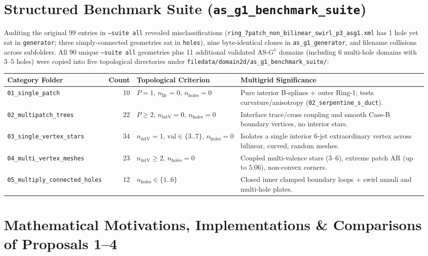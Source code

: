 \documentclass[10pt,a4paper]{article}
\begin{document}
\section{Structured Benchmark Suite (\texttt{as\_g1\_benchmark\_suite})}
Auditing the original 99 entries in \texttt{--suite all} revealed misclassifications (\texttt{ring\_7patch\_non\_bilinear\_swirl\_p3\_asg1.xml} has 1 hole yet sat in \texttt{generator}; three simply-connected geometries sat in \texttt{holes}), nine byte-identical clones in \texttt{as\_g1\_generator}, and filename collisions across subfolders. All 90 unique \texttt{--suite all} geometries plus 11 additional validated AS-$G^1$ domains (including 6 multi-hole domains with $3\text{--}5$ holes) were copied into five topological directories under \texttt{filedata/domain2d/as\_g1\_benchmark\_suite/}:

\begin{center}
\small
\begin{tabular}{@{}lrlp{7.8cm}@{}}
\toprule
\textbf{Category Folder} & \textbf{Count} & \textbf{Topological Criterion} & \textbf{Multigrid Significance} \\
\midrule
\texttt{01\_single\_patch} & 10 & $P=1,\, n_{\text{Ifc}}=0,\, n_{\text{holes}}=0$ & Pure interior B-splines + outer Ring-1; tests curvature/anisotropy (\texttt{02\_serpentine\_s\_duct}). \\
\texttt{02\_multipatch\_trees} & 22 & $P\ge 2,\, n_{\text{intV}}=0,\, n_{\text{holes}}=0$ & Interface trace/cross coupling and smooth Case-B boundary vertices, no interior stars. \\
\texttt{03\_single\_vertex\_stars} & 34 & $n_{\text{intV}}=1,\, \text{val}\in\{3..7\},\, n_{\text{holes}}=0$ & Isolates a single interior 6-jet extraordinary vertex across bilinear, curved, random meshes. \\
\texttt{04\_multi\_vertex\_meshes} & 23 & $n_{\text{intV}}\ge 2,\, n_{\text{holes}}=0$ & Coupled multi-valence stars ($3\text{--}6$), extreme patch AR (up to $5.06$), non-convex corners. \\
\texttt{05\_multiply\_connected\_holes} & 12 & $n_{\text{holes}}\in\{1..6\}$ & Closed inner clamped boundary loops + swirl annuli and multi-hole plates. \\
\bottomrule
\end{tabular}
\end{center}

\section{Mathematical Motivations, Implementations \& Comparisons of Proposals 1--4}
\end{document}

